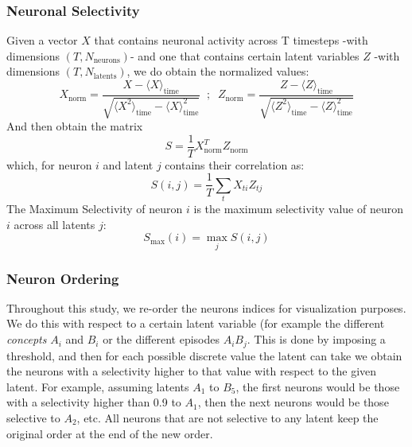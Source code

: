 \documentclass{article}
\begin{document}
\subsubsection*{Neuronal Selectivity}
Given a vector $X$ that contains neuronal activity across T timesteps -with dimensions $(T, N_\textrm{neurons})$- and one that contains certain latent variables $Z$ -with dimensions  $(T, N_\textrm{latents})$, we do obtain the normalized values:
\begin{equation}
    X_\textrm{norm} = \frac{X - \langle X \rangle_{\textrm{time}}}{\sqrt{\langle X^2 \rangle_\textrm{time} - \langle X \rangle_\textrm{time}^2}} \;\; ; \;\; Z_\textrm{norm} = \frac{Z - \langle Z \rangle_{\textrm{time}}}{\sqrt{\langle Z^2 \rangle_\textrm{time} - \langle Z \rangle_\textrm{time}^2}}
\end{equation} 
And then obtain the matrix 
\begin{equation}
    S = \frac{1}{T}X_\textrm{norm}^TZ_\textrm{norm}
\end{equation}
which, for neuron $i$ and latent $j$ contains their correlation as:
\begin{equation}
    S(i, j) = \frac{1}{T}\sum_t X_{ti}Z_{tj}
\end{equation}
The Maximum Selectivity of neuron $i$ is the maximum selectivity value of neuron $i$ across all latents $j$:
\begin{equation}
    S_\textrm{max}(i) = \max_{j}{S(i, j)}
\end{equation}
\subsubsection*{Neuron Ordering}
Throughout this study, we re-order the neurons indices for visualization purposes. We do this with respect to a certain latent variable (for example the different \textit{concepts} $A_i$ and $B_i$ or the different episodes $A_iB_j$. This is done by imposing a threshold, and then for each possible discrete value the latent can take we obtain the neurons with a selectivity higher to that value with respect to the given latent. For example, assuming latents $A_1$ to $B_5$, the first neurons would be those with a selectivity higher than 0.9 to $A_1$, then the next neurons would be those selective to $A_2$, etc. All neurons that are not selective to any latent keep the original order at the end of the new order.
\end{document}
